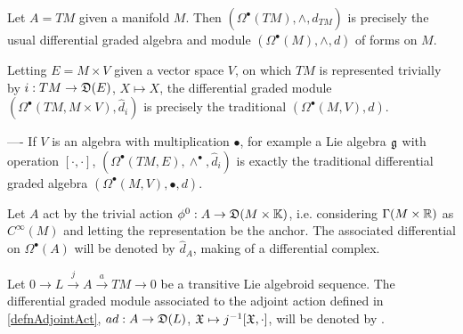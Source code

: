 \lin

\begin{example}\label{exampleTraditionalCaseTangentBundleUpToDifferential}
Let $A = TM$ given a manifold $M$. Then $(\Omega^\bullet (TM), \wedge, \hat d_{TM})$ is precisely the usual differential graded algebra and module $(\Omega^\bullet (M), \wedge, d)$ of forms on $M$.

Letting $E = M \times V$ given a vector space $V$, on which $TM$ is represented trivially by $i: TM \to \mathfrak{D}(E)$, $X \mapsto X$, the differential graded module $(\Omega^\bullet(TM, M \times V), \hat d_i)$ is precisely the traditional $(\Omega^\bullet(M, V), d)$. 

---- If $V$ is an algebra with multiplication $\bullet$, for example a Lie algebra $\mathfrak{g}$ with operation $[\cdot, \cdot]$, $(\Omega^\bullet(TM, E), \wedge^\bullet, \hat d_i)$ is exactly the traditional differential graded algebra $(\Omega^\bullet(M, V), \bullet, d)$.
\end{example}

\begin{example}\label{exampleScalarValuedFormsOnAUpToDifferential}
Let $A$ act by the trivial action $\phi^0: A \to \alg D(M \times \bb K)$, i.e. considering $\Gamma(M \times \mathbb{R})$ as $C^\infty(M)$ and letting the representation be the anchor. The associated differential on $\Omega^\bullet(A)$ will be denoted by $\hat d_A$, making of  a differential complex.
\end{example}

\begin{example}\label{exampleLValuedFormsonTransitiveAUpToDifferential}
Let $0 \to L \xrightarrow{j} A \xrightarrow{a} TM \to 0$ be a transitive Lie algebroid sequence.
The differential graded module associated to the adjoint action defined in \ref{defnAdjointAct}, $ad: A \to \mathfrak{D}(L)$, $\mathfrak{X} \mapsto j^{-1}[\mathfrak{X}, \cdot]$, will be denoted by .
\end{example}

\linea

